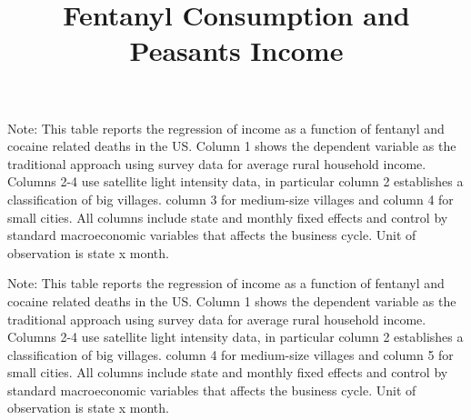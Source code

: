 \documentclass[12 pt,fullpage]{article}
\title{\textbf{Fentanyl Consumption and Peasants Income}}
\author{\vspace{-30mm}}
\theoremstyle{plain}
\begin{document}
	\date{\vspace{-25mm}}
	\maketitle
	\vspace{-15mm}



\newpage

\begin{table}[h!]
	\begin{center}
		\scalebox{0.6}{
			}
		\caption{}
	\end{center}
\end{table}
\vspace{-3mm}
\footnotesize Note: This table reports the regression of income as a function of fentanyl and cocaine related deaths in the US. Column 1 shows the dependent variable as the traditional approach using survey data for average rural household income. Columns 2-4 use satellite light intensity data, in particular column 2 establishes a classification of big villages. column 3 for medium-size villages and column 4 for small cities. All columns include state and monthly fixed effects and control by standard macroeconomic variables that affects the business cycle. Unit of observation is state x month. 


\newpage
\begin{table}[h!]
	\begin{center}
		\scalebox{0.6}{
			}
		\caption{}
	\end{center}
\end{table}
\vspace{-3mm}
\footnotesize Note: This table reports the regression of income as a function of fentanyl and cocaine related deaths in the US. Column 1 shows the dependent variable as the traditional approach using survey data for average rural household income. Columns 2-4 use satellite light intensity data, in particular column 2 establishes a classification of big villages. column 4 for medium-size villages and column 5 for small cities. All columns include state and monthly fixed effects and control by standard macroeconomic variables that affects the business cycle. Unit of observation is state x month. 
\end{document}
